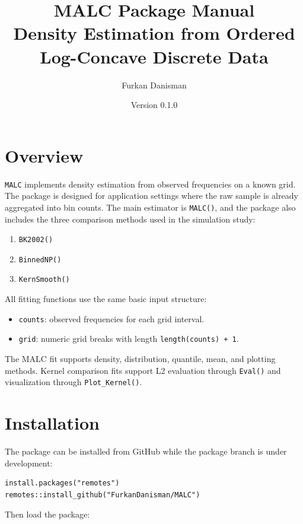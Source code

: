 \documentclass[11pt]{article}
\title{\textbf{MALC Package Manual}\\
\large Density Estimation from Ordered Log-Concave Discrete Data}
\author{Furkan Danisman}
\date{Version 0.1.0}
\begin{document}
\maketitle

\tableofcontents
\newpage

\section{Overview}

\texttt{MALC} implements density estimation from observed frequencies on a
known grid. The package is designed for application settings where the raw
sample is already aggregated into bin counts. The main estimator is
\texttt{MALC()}, and the package also includes the three comparison methods
used in the simulation study:

\begin{enumerate}
  \item \texttt{BK2002()}
  \item \texttt{BinnedNP()}
  \item \texttt{KernSmooth()}
\end{enumerate}

All fitting functions use the same basic input structure:

\begin{itemize}
  \item \texttt{counts}: observed frequencies for each grid interval.
  \item \texttt{grid}: numeric grid breaks with length \texttt{length(counts) + 1}.
\end{itemize}

The MALC fit supports density, distribution, quantile, mean, and plotting
methods. Kernel comparison fits support L2 evaluation through \texttt{Eval()}
and visualization through \texttt{Plot\_Kernel()}.

\section{Installation}

The package can be installed from GitHub while the package branch is under
development:

\begin{lstlisting}
install.packages("remotes")
remotes::install_github("FurkanDanisman/MALC")
\end{lstlisting}

Then load the package:
\end{document}
